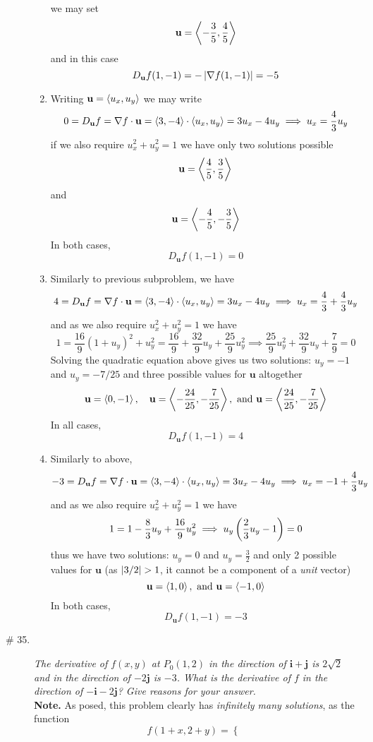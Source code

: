 \documentclass[8pt]{article} %
\begin{document}
\begin{description}
\begin{enumerate}[\bfseries a.]
				we may set \[\mathbf{u}=\left<-\frac{3}{5},\frac{4}{5}\right>\]
				and in this case
				\[D_{\mathbf{u}}f(1,-1)=-\left|\nabla f(1,-1)\right|=-5\]
			\item Writing $\mathbf{u}=\left<u_x,u_y\right>$ we may write
				\[0=D_{\mathbf{u}}f=\nabla f\cdot\mathbf{u}=\left<3,-4\right>\cdot\left<u_x,u_y\right>=3u_x-4u_y\implies u_x=\frac{4}{3}u_y\]
				if we also require $u_x^2+u_y^2=1$ we have only two solutions possible
				\[\mathbf{u}=\left<\frac{4}{5},\frac{3}{5}\right>\]
				and
				\[\mathbf{u}=\left<-\frac{4}{5},-\frac{3}{5}\right>\]
				In both cases,
				\[D_{\mathbf{u}}f(1,-1)=0\]
			\item Similarly to previous subproblem, we have
				\[4=D_{\mathbf{u}}f=\nabla f\cdot\mathbf{u}=\left<3,-4\right>\cdot\left<u_x,u_y\right>=3u_x-4u_y
				\implies u_x=\frac{4}{3}+\frac{4}{3}u_y\]
				and as we also require $u_x^2+u_y^2=1$ we have
				\[1=\frac{16}{9}(1+u_y)^2+u_y^2=\frac{16}{9}+\frac{32}{9}u_y+\frac{25}{9}u_y^2\implies \frac{25}{9}u_y^2+\frac{32}
				{9}u_y+\frac{7}{9}=0\]
				Solving the quadratic equation above gives us two solutions: $u_y=-1$ and $u_y=-7/25$ and three possible values
				for $\mathbf{u}$ altogether
				\[\mathbf{u}=\left<0,-1\right>,\quad \mathbf{u}=\left<-\frac{24}{25},-\frac{7}{25}\right>,\mbox{ and }
				\mathbf{u}=\left<\frac{24}{25},-\frac{7}{25}\right>\]
				In all cases,
				\[D_{\mathbf{u}}f(1,-1)=4\]
			\item Similarly to above,
				\[-3=D_{\mathbf{u}}f=\nabla f\cdot\mathbf{u}=\left<3,-4\right>\cdot\left<u_x,u_y\right>=3u_x-4u_y\implies u_x=-1+\frac{4}{3}
				u_y\]
				and as we also require $u_x^2+u_y^2=1$ we have
				\[1=1-\frac{8}{3}u_y+\frac{16}{9}u_y^2\implies u_y\left(\frac{2}{3}u_y-1\right)=0\]
				thus we have two solutions: $u_y=0$ and $u_y=\frac{3}{2}$ and only 2 possible values for $\mathbf{u}$ (as
				$\myabs{3/2}>1$, it cannot be a component of a \textit{unit} vector)
				\[\mathbf{u}=\left<1,0\right>,\mbox{ and }\mathbf{u}=\left<-1,0\right>\]
				In both cases,
				\[D_{\mathbf{u}}f(1,-1)=-3\]
		\end{enumerate}
	\item[\# 35.]{{\it The derivative of $f(x,y)$ at $P_0(1,2)$ in the direction of $\mathbf{i}+\mathbf{j}$ is $2\sqrt{2}$ and in the direction
		of $-2\mathbf{j}$ is $-3$. What is the derivative of $f$ in the direction of $-\mathbf{i}-2\mathbf{j}$? Give reasons for your answer.
		}\\
		\textbf{Note.} As posed, this problem clearly has {\it infinitely many solutions}, as the function
		\[f(1+x,2+y)=\left\{\begin{array}{ll}

\end{array}\]}
\end{description}
\end{document}
